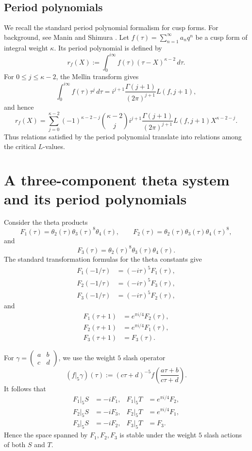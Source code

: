 \documentclass[preprint,12pt]{elsarticle}
\theoremstyle{definition}
\theoremstyle{remark}
\begin{document}
	
	



\subsection{Period polynomials}
We recall the standard period polynomial formalism for cusp forms. For background, see Manin \cite{MR314846,MR345909} and Shimura \cite{MR463119}.
Let $f(\tau)=\sum_{n=1}^{\infty}a_nq^n$ be a cusp form of integral weight $\kappa$. Its period polynomial is defined by 
\[
r_f(X):=\int_0^{i\infty}f(\tau)(\tau-X)^{\kappa-2}\,d\tau.
\]
For $0\leq j\leq \kappa-2$, the Mellin transform gives
\[
\int_0^{i\infty}f(\tau)\tau^j\,d\tau
=i^{j+1}\frac{\Gamma(j+1)}{(2\pi)^{j+1}}L(f,j+1),
\]
and hence
\[
r_f(X)=\sum_{j=0}^{\kappa-2}
(-1)^{\kappa-2-j}\binom{\kappa-2}{j}
i^{j+1}\frac{\Gamma(j+1)}{(2\pi)^{j+1}}
L(f,j+1)X^{\kappa-2-j}.
\]
Thus relations satisfied by the period polynomial translate into relations among the critical $L$-values.

	
\section{A three-component theta system and its period polynomials}\label{three-theta}
	


Consider the theta products
\[
F_1(\tau)=\theta_2(\tau)\theta_3(\tau)^8\theta_4(\tau),\qquad
F_2(\tau)=\theta_2(\tau)\theta_3(\tau)\theta_4(\tau)^8,
\]
and
\[
F_3(\tau)=\theta_2(\tau)^8\theta_3(\tau)\theta_4(\tau).
\]
The standard transformation formulas for the theta constants give
\begin{align*}
	F_1(-1/\tau)&=(-i\tau)^5F_1(\tau),\\
	F_2(-1/\tau)&=(-i\tau)^5F_3(\tau),\\
	F_3(-1/\tau)&=(-i\tau)^5F_2(\tau),
\end{align*}
and
\begin{align*}
	F_1(\tau+1)&=e^{\pi i/4}F_2(\tau),\\
	F_2(\tau+1)&=e^{\pi i/4}F_1(\tau),\\
	F_3(\tau+1)&=F_3(\tau).
\end{align*}

For $\gamma=\begin{pmatrix}a&b\\c&d\end{pmatrix}$, we use the weight $5$ slash operator
\[
(f|_5\gamma)(\tau):=(c\tau+d)^{-5}f\left(\frac{a\tau+b}{c\tau+d}\right).
\]
It follows that
\begin{align*}
	F_1|_5S&=-iF_1,& F_1|_5T&=e^{\pi i/4}F_2,\\
	F_2|_5S&=-iF_3,& F_2|_5T&=e^{\pi i/4}F_1,\\
	F_3|_5S&=-iF_2,& F_3|_5T&=F_3.
\end{align*}
Hence the space spanned by $F_1,F_2,F_3$ is stable under the weight $5$ slash actions of both $S$ and $T$.
\end{document}

